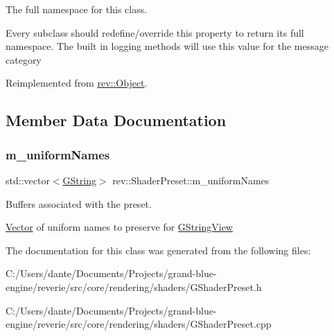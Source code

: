 The full namespace for this class. 

Every subclass should redefine/override this property to return its full namespace. The built in logging methods will use this value for the message category 

Reimplemented from \mbox{\hyperlink{classrev_1_1_object_aaeb638d3e10f361c56c211a318a27f3d}{rev\+::\+Object}}.



\subsection{Member Data Documentation}
\mbox{\label{classrev_1_1_shader_preset_a53dc7afd60ed65e3fb20c1c3a99be92b}} 
\subsubsection{\texorpdfstring{m\_uniformNames}{m\_uniformNames}}
{\footnotesize\ttfamily std\+::vector$<$\mbox{\hyperlink{classrev_1_1_g_string}{G\+String}}$>$ rev\+::\+Shader\+Preset\+::m\+\_\+uniform\+Names\hspace{0.3cm}{\ttfamily [protected]}}



Buffers associated with the preset. 

\mbox{\hyperlink{classrev_1_1_vector}{Vector}} of uniform names to preserve for \mbox{\hyperlink{classrev_1_1_g_string_view}{G\+String\+View}} 

The documentation for this class was generated from the following files\+:\begin{DoxyCompactItemize}
\item 
C\+:/\+Users/dante/\+Documents/\+Projects/grand-\/blue-\/engine/reverie/src/core/rendering/shaders/G\+Shader\+Preset.\+h\item 
C\+:/\+Users/dante/\+Documents/\+Projects/grand-\/blue-\/engine/reverie/src/core/rendering/shaders/G\+Shader\+Preset.\+cpp\end{DoxyCompactItemize}
